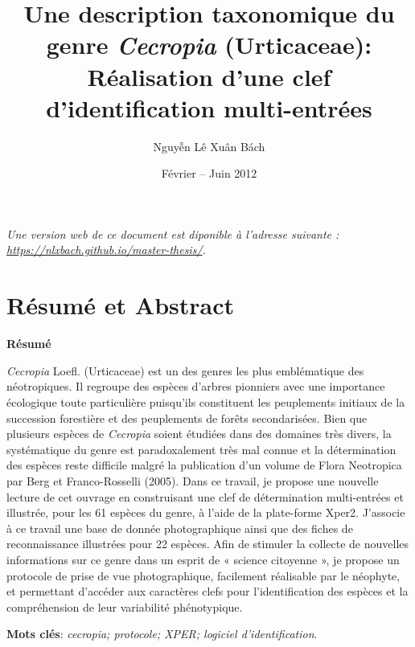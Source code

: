 \documentclass[a4paper]{article}
\title{Une description taxonomique du genre \textit{Cecropia} (Urticaceae): Réalisation
d'une clef d'identification multi-entrées}
\author{Nguyễn Lê Xuân Bách}
\date{Février -- Juin 2012}
\theoremstyle{definition}
\theoremstyle{definition}
\theoremstyle{definition}
\theoremstyle{remark}
\begin{document}

\maketitle
  \vspace*{\fill}
  \emph{Une version web de ce document est diponible à l'adresse suivante : \url{https://nlxbach.github.io/master-thesis/}.}
  \newpage


{
\hypersetup{linkcolor=black}
\setcounter{tocdepth}{2}
\newpage
\tableofcontents
}
\newpage
{}

\section*{Résumé et Abstract}\label{resume-et-abstract}

\textbf{Résumé}

\emph{Cecropia} Loefl. (Urticaceae) est un des genres les plus
emblématique des néotropiques. Il regroupe des espèces d'arbres
pionniers avec une importance écologique toute particulière puisqu'ils
constituent les peuplements initiaux de la succession forestière et des
peuplements de forêts secondarisées. Bien que plusieurs espèces de
\emph{Cecropia} soient étudiées dans des domaines très divers, la
systématique du genre est paradoxalement très mal connue et la
détermination des espèces reste difficile malgré la publication d'un
volume de Flora Neotropica par Berg et Franco-Rosselli (2005). Dans ce
travail, je propose une nouvelle lecture de cet ouvrage en construisant
une clef de détermination multi-entrées et illustrée, pour les 61
espèces du genre, à l'aide de la plate-forme Xper2. J'associe à ce
travail une base de donnée photographique ainsi que des fiches de
reconnaissance illustrées pour 22 espèces. Afin de stimuler la collecte
de nouvelles informations sur ce genre dans un esprit de « science
citoyenne », je propose un protocole de prise de vue photographique,
facilement réalisable par le néophyte, et permettant d'accéder aux
caractères clefs pour l'identification des espèces et la compréhension
de leur variabilité phénotypique.

\textbf{Mots clés}: \emph{cecropia; protocole; XPER; logiciel
d'identification}.
\end{document}

